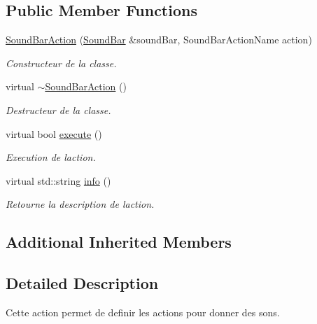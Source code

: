\subsection*{Public Member Functions}
\begin{DoxyCompactItemize}
\item 
\hyperlink{classSoundBarAction_ab41056739f81ce59ff1eb834901c7ac8}{Sound\+Bar\+Action} (\hyperlink{classSoundBar}{Sound\+Bar} \&sound\+Bar, Sound\+Bar\+Action\+Name action)
\begin{DoxyCompactList}\small\item\em Constructeur de la classe. \end{DoxyCompactList}\item 
\mbox{\label{classSoundBarAction_a7e9b6ffb6f470bc388663bd46efec01d}} 
virtual \hyperlink{classSoundBarAction_a7e9b6ffb6f470bc388663bd46efec01d}{$\sim$\+Sound\+Bar\+Action} ()
\begin{DoxyCompactList}\small\item\em Destructeur de la classe. \end{DoxyCompactList}\item 
\mbox{\label{classSoundBarAction_ad080a35d375a14b912ed5d2625c0b687}} 
virtual bool \hyperlink{classSoundBarAction_ad080a35d375a14b912ed5d2625c0b687}{execute} ()
\begin{DoxyCompactList}\small\item\em Execution de l\textquotesingle{}action. \end{DoxyCompactList}\item 
\mbox{\label{classSoundBarAction_a97571705989078d384ca586307d98bb7}} 
virtual std\+::string \hyperlink{classSoundBarAction_a97571705989078d384ca586307d98bb7}{info} ()
\begin{DoxyCompactList}\small\item\em Retourne la description de l\textquotesingle{}action. \end{DoxyCompactList}\end{DoxyCompactItemize}
\subsection*{Additional Inherited Members}


\subsection{Detailed Description}
Cette action permet de definir les actions pour donner des sons. 

